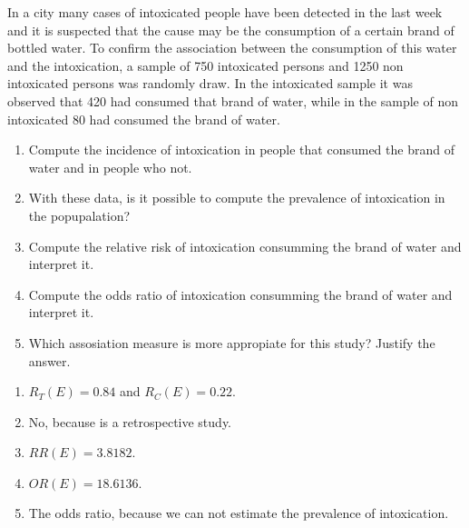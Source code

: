 {In a city many cases of intoxicated people have been detected in the last week and it is suspected that the cause may be the consumption of a certain brand of bottled water.
To confirm the association between the consumption of this water and the intoxication, a sample of 750 intoxicated persons and 1250 non intoxicated persons was randomly draw.
In the intoxicated sample it was observed that 420 had consumed that brand of water, while in the sample of non intoxicated 80 had consumed the brand of water.

\begin{enumerate}
\item Compute the incidence of intoxication in people that consumed the brand of water and in people who not. 
\item With these data, is it possible to compute the prevalence of intoxication in the popupalation?
\item Compute the relative risk of intoxication consumming the brand of water and interpret it.
\item Compute the odds ratio of intoxication consumming the brand of water and interpret it.
\item Which assosiation measure is more appropiate for this study? Justify the answer.
\end{enumerate}
}
{
\begin{enumerate}
\item $R_T(E)=0.84$ and $R_C(E)=0.22$.
\item No, because is a retrospective study.
\item $RR(E)=3.8182$.
\item $OR(E)=18.6136$.
\item The odds ratio, because we can not estimate the prevalence of intoxication.
\end{enumerate}
}
{
}

